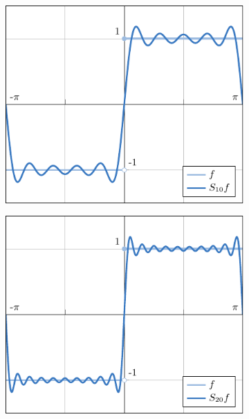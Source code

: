 \documentclass{beamer}
\begin{document}
\begin{frame}
    \begin{figure}[H]
    \centering
    \begin{subfigure}[b]{0.49\textwidth}
        \centering
        \includegraphics[scale = 0.58]{images/6.pdf}
    \end{subfigure}
    \begin{subfigure}[b]{0.49\textwidth}
        \centering
        \includegraphics[scale = 0.58]{images/7.pdf}
    \end{subfigure}
    \par\bigskip
    \begin{subfigure}[b]{0.49\textwidth}
        \centering

\end{subfigure}
\end{figure}
\end{frame}
\end{document}
